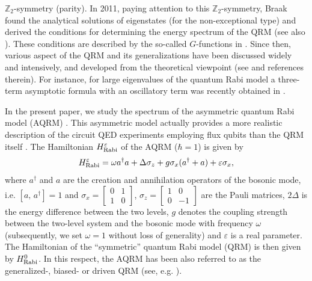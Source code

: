 \documentclass[11pt]{article}
\numberwithin{equation}{section}
\newcommand{\Z}{\mathbb{Z}} %
\newcommand{\e}{\varepsilon}
\newcommand{\HRabi}[1]{H_{\text{\upshape Rabi}}^{#1}} %
\theoremstyle{plain}
\theoremstyle{definition}
\theoremstyle{remark}
\begin{document}
$\Z_2$-symmetry (parity). In 2011, paying attention to this $\Z_2$-symmetry, Braak found the analytical solutions of eigenstates (for the non-exceptional type)
and derived the conditions for determining the energy spectrum of the QRM \cite{B2011PRL} (see also \cite{B2013MfI}).
These conditions are described by the so-called $G$-functions in \cite{B2011PRL,B2011PRL-OnlineSupplement}.
Since then, various aspect of the QRM and its generalizations have been discussed widely and intensively,
and developed from the theoretical viewpoint (see \cite{Le2016} and references therein). For instance, for large eigenvalues of the quantum Rabi model a three-term asymptotic formula with an oscillatory term was recently obtained in \cite{BdMZ2019}.

In the present paper, we study the spectrum of the asymmetric quantum Rabi model (AQRM) \cite{Le2016}.
This asymmetric model actually provides a more realistic description of the circuit QED experiments
employing flux qubits than the QRM itself \cite{Ni2010,YS2018}. The Hamiltonian $\HRabi{\e}$ of the AQRM ($\hbar=1$) is given by
\begin{equation}\label{eq:aH}
  \HRabi{\e} = \omega a^\dag a+\Delta \sigma_z +g\sigma_x(a^\dag+a) + \e \sigma_x,
\end{equation}
where $a^\dag$ and $a$ are the creation and annihilation operators of the bosonic mode,
i.e. $[a,\,a^\dag]=1$ and
\(\sigma_x = \begin{bmatrix}
 0 & 1  \\
 1 & 0
\end{bmatrix} \),
\( \sigma_z= \begin{bmatrix}
 1 & 0  \\
 0 & -1
\end{bmatrix}\)
are the Pauli matrices, $2\Delta$ is the energy difference between the two levels,
$g$ denotes the coupling strength between the two-level system and the bosonic mode with frequency $\omega$
(subsequently, we set $\omega=1$ without loss of generality) and \(\e\) is a real parameter.
The Hamiltonian of the ``symmetric'' quantum Rabi model (QRM) is then given by $\HRabi{0}$.
In this respect, the AQRM has been also referred to as the generalized-, biased- or driven QRM
(see, e.g. \cite{B2011PRL,LB2015JPA,Le2016}).
\end{document}

